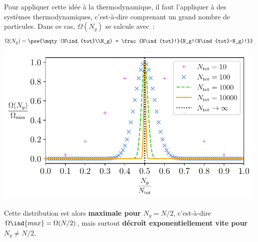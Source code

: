 \documentclass[../../main/main.tex]{subfiles}
\begin{document}
\noindent
\begin{minipage}[c]{.50\linewidth}
	Pour appliquer cette idée à la thermodynamique, il faut l'appliquer à des
	systèmes thermodynamiques, c'est-à-dire comprenant un grand nombre de
	particules. Dans ce cas, $\Omega(N_g)$ se calcule avec~:
	\[
		\Omega(N_g) =
		\psw{\mqty(N\ind{tot}\\N_g) =
			\frac{N\ind{tot}!}{N_g!(N\ind{tot}-N_g)!}}
	\]
\end{minipage}
\hfill
\begin{minipage}[c]{.48\linewidth}
	\begin{center}
		\includegraphics[width=\linewidth]{proba_etat}
	\end{center}
\end{minipage}

Cette distribution est alors \textbf{maximale pour $N_g = N/2$}, c'est-à-dire
$\Omega\ind{max} = \Omega(N/2)$, mais surtout \textbf{décroît exponentiellement
	vite pour $N_g \neq N/2$}.
\end{document}
